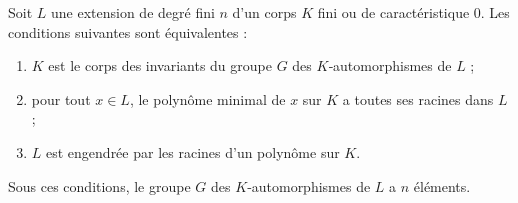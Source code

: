 \documentclass[11pt, useosf,
  title in boldface,
  theorem in new line,
  theorem numbering = section,
  number theorems separately,
]{simplivre}
\begin{document}
    \begin{theorem}\label{thm:extension galoisienne}
        Soit \( L \) une extension de degré fini \( n \) d'un corps \( K \) fini ou de caractéristique \( 0 \). Les conditions suivantes sont équivalentes :
        \begin{enumerate}
            \item \label{thm:extension galoisienne;cond1} \( K \) est le corps des invariants du groupe \( G \) des \( K \)‑automorphismes de \( L \) ;
            \item \label{thm:extension galoisienne;cond2} pour tout \( x \in L \), le polynôme minimal de \( x \) sur \( K \) a toutes ses racines dans \( L \) ;
            \item \label{thm:extension galoisienne;cond3} \( L \) est engendrée par les racines d'un polynôme sur \( K \).
        \end{enumerate}
        Sous ces conditions, le groupe \( G \) des \( K \)‑automorphismes de \( L \) a \( n \) éléments.
    \end{theorem}
\end{document}

